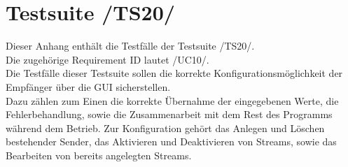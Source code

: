 \chapter{Testsuite /TS20/}
Dieser Anhang enthält die Testfälle der Testsuite /TS20/.\\
Die zugehörige Requirement ID lautet /UC10/.\\
\newline
Die Testfälle dieser Testsuite sollen die korrekte Konfigurationsmöglichkeit der Empfänger über die GUI sicherstellen.\\
Dazu zählen zum Einen die korrekte Übernahme der eingegebenen Werte, die Fehlerbehandlung, sowie die Zusammenarbeit mit dem Rest des Programms während dem Betrieb.
Zur Konfiguration gehört das Anlegen und Löschen bestehender Sender, das Aktivieren und Deaktivieren von Streams, sowie das Bearbeiten von bereits angelegten Streams.


